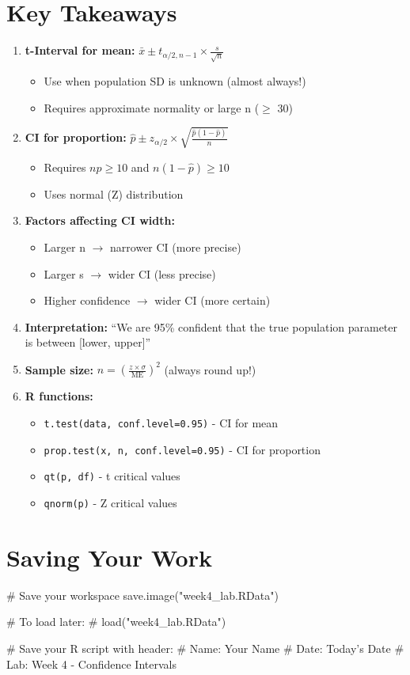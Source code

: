 \documentclass[11pt]{article}
\begin{document}
\section{Key Takeaways}

\begin{enumerate}
\item \textbf{t-Interval for mean:} $\bar{x} \pm t_{\alpha/2, n-1} \times \frac{s}{\sqrt{n}}$
  \begin{itemize}
  \item Use when population SD is unknown (almost always!)
  \item Requires approximate normality or large n ($\geq$ 30)
  \end{itemize}

\item \textbf{CI for proportion:} $\hat{p} \pm z_{\alpha/2} \times \sqrt{\frac{\hat{p}(1-\hat{p})}{n}}$
  \begin{itemize}
  \item Requires $n\hat{p} \geq 10$ and $n(1-\hat{p}) \geq 10$
  \item Uses normal (Z) distribution
  \end{itemize}

\item \textbf{Factors affecting CI width:}
  \begin{itemize}
  \item Larger n $\to$ narrower CI (more precise)
  \item Larger s $\to$ wider CI (less precise)
  \item Higher confidence $\to$ wider CI (more certain)
  \end{itemize}

\item \textbf{Interpretation:} ``We are 95\% confident that the true population parameter is between [lower, upper]''

\item \textbf{Sample size:} $n = \left(\frac{z \times \sigma}{\text{ME}}\right)^2$ (always round up!)

\item \textbf{R functions:}
  \begin{itemize}
  \item \texttt{t.test(data, conf.level=0.95)} - CI for mean
  \item \texttt{prop.test(x, n, conf.level=0.95)} - CI for proportion
  \item \texttt{qt(p, df)} - t critical values
  \item \texttt{qnorm(p)} - Z critical values
  \end{itemize}
\end{enumerate}

\section{Saving Your Work}

\begin{rcode}
# Save your workspace
save.image("week4_lab.RData")

# To load later:
# load("week4_lab.RData")

# Save your R script with header:
# Name: Your Name
# Date: Today's Date
# Lab: Week 4 - Confidence Intervals
\end{rcode}
\end{document}
